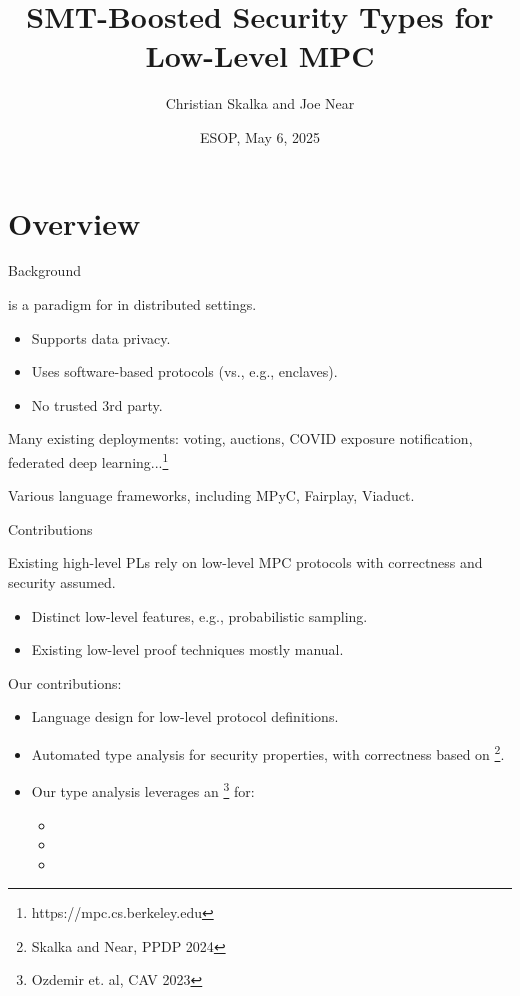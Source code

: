 \documentclass{beamer}
\title{SMT-Boosted Security Types for Low-Level MPC}
\author{Christian Skalka and Joe Near}
\date{ESOP, May 6, 2025}
\begin{document}
\begin{frame}
    \titlepage 
\end{frame}

\logo{}



\section{Overview}

\begin{frame}{Background}
  
   is a paradigm for
   in distributed settings.
  \begin{itemize}
  \item Supports data privacy.
  \item Uses software-based protocols (vs., e.g., enclaves).
  \item No trusted 3rd party.
  \end{itemize}
  Many existing deployments: voting, auctions, COVID exposure notification, federated deep learning...\footnote{https://mpc.cs.berkeley.edu}

  \medskip

  Various language frameworks, including MPyC, Fairplay, Viaduct.
\end{frame}

\begin{frame}{Contributions}

  Existing high-level PLs rely on low-level MPC protocols with correctness and security
  assumed.
  \begin{itemize}
  \item Distinct low-level features, e.g., probabilistic sampling.
  \item Existing low-level proof techniques mostly manual.
  \end{itemize}
  Our contributions:
  \begin{itemize}
  \item Language design for low-level protocol definitions.
  \item Automated type analysis for security properties, with correctness based on
    \footnote{Skalka and Near, PPDP 2024}.
  \item Our type analysis leverages an \footnote{Ozdemir et. al, CAV 2023} for:
    \begin{itemize}
    \item {}
    \item {}
    \item {}
    \end{itemize}
  \end{itemize}
  
\end{frame}
\end{document}
